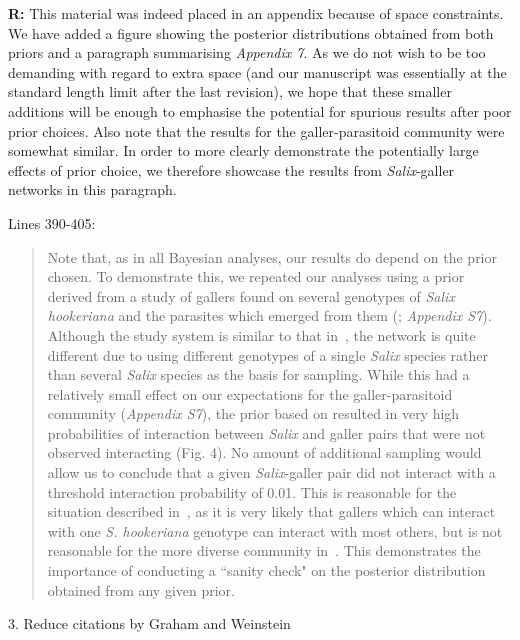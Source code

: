 \documentclass[12pt]{letter}
\begin{document}
		\textbf{R:} This material was indeed placed in an appendix because of space constraints. We have added a figure showing the posterior distributions obtained from both priors and a paragraph summarising \emph{Appendix 7}. As we do not wish to be too demanding with regard to extra space (and our manuscript was essentially at the standard length limit after the last revision), we hope that these smaller additions will be enough to emphasise the potential for spurious results after poor prior choices. Also note that the results for the galler-parasitoid community were somewhat similar. In order to more clearly demonstrate the potentially large effects of prior choice, we therefore showcase the results from \emph{Salix}-galler networks in this paragraph.


		Lines 390-405:

		\begin{quotation}

		  Note that, as in all Bayesian analyses, our results do depend on the prior chosen. To demonstrate this, we repeated our analyses using a prior derived from a study of gallers found on several genotypes of \emph{Salix hookeriana} and the parasites which emerged from them (\citealp{Barbour2016,Barbour2016Dryad}; \emph{Appendix S7}). Although the study system is similar to that in~\citet{Kopelke2017}, the network is quite different due to using different genotypes of a single \emph{Salix} species rather than several \emph{Salix} species as the basis for sampling. While this had a relatively small effect on our expectations for the galler-parasitoid community (\emph{Appendix S7}), the prior based on \citep{Barbour2016} resulted in very high probabilities of interaction between \emph{Salix} and galler pairs that were not observed interacting (Fig. 4). No amount of additional sampling would allow us to conclude that a given \emph{Salix}-galler pair did not interact with a threshold interaction probability of 0.01. This is reasonable for the situation described in~\citet{Barbour2016}, as it is very likely that gallers which can interact with one \emph{S. hookeriana} genotype can interact with most others, but is not reasonable for the more diverse community in~\citet{Kopelke2017}. This demonstrates the importance of conducting a ``sanity check" on the posterior distribution obtained from any given prior.

		\end{quotation}



	3. Reduce citations by Graham and Weinstein 
\end{document}
